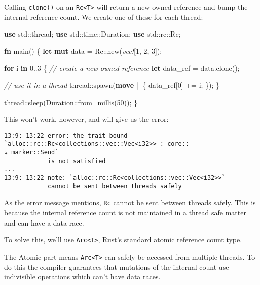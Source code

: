 \documentclass[a4paper,]{book}
\newenvironment{Shaded}{\begin{snugshade}}{\end{snugshade}}
\newcommand{\KeywordTok}[1]{\textcolor[rgb]{0.13,0.29,0.53}{\textbf{{#1}}}}
\newcommand{\DecValTok}[1]{\textcolor[rgb]{0.00,0.00,0.81}{{#1}}}
\newcommand{\CommentTok}[1]{\textcolor[rgb]{0.56,0.35,0.01}{\textit{{#1}}}}
\newcommand{\PreprocessorTok}[1]{\textcolor[rgb]{0.56,0.35,0.01}{\textit{{#1}}}}
\newcommand{\NormalTok}[1]{{#1}}
\begin{document}
Calling \texttt{clone()} on an \texttt{Rc\textless{}T\textgreater{}}
will return a new owned reference and bump the internal reference count.
We create one of these for each thread:

\begin{Shaded}
\begin{Highlighting}[]
\KeywordTok{use} \NormalTok{std::thread;}
\KeywordTok{use} \NormalTok{std::time::Duration;}
\KeywordTok{use} \NormalTok{std::rc::Rc;}

\KeywordTok{fn} \NormalTok{main() \{}
    \KeywordTok{let} \KeywordTok{mut} \NormalTok{data = Rc::new(}\PreprocessorTok{vec!}\NormalTok{[}\DecValTok{1}\NormalTok{, }\DecValTok{2}\NormalTok{, }\DecValTok{3}\NormalTok{]);}

    \KeywordTok{for} \NormalTok{i }\KeywordTok{in} \DecValTok{0.}\NormalTok{.}\DecValTok{3} \NormalTok{\{}
        \CommentTok{// create a new owned reference}
        \KeywordTok{let} \NormalTok{data_ref = data.clone();}

        \CommentTok{// use it in a thread}
        \NormalTok{thread::spawn(}\KeywordTok{move} \NormalTok{|| \{}
            \NormalTok{data_ref[}\DecValTok{0}\NormalTok{] += i;}
        \NormalTok{\});}
    \NormalTok{\}}

    \NormalTok{thread::sleep(Duration::from_millis(}\DecValTok{50}\NormalTok{));}
\NormalTok{\}}
\end{Highlighting}
\end{Shaded}

This won't work, however, and will give us the error:

\begin{verbatim}
13:9: 13:22 error: the trait bound `alloc::rc::Rc<collections::vec::Vec<i32>> : core::
↳ marker::Send`
            is not satisfied
...
13:9: 13:22 note: `alloc::rc::Rc<collections::vec::Vec<i32>>`
            cannot be sent between threads safely
\end{verbatim}

As the error message mentions, \texttt{Rc} cannot be sent between
threads safely. This is because the internal reference count is not
maintained in a thread safe matter and can have a data race.

To solve this, we'll use \texttt{Arc\textless{}T\textgreater{}}, Rust's
standard atomic reference count type.

The Atomic part means \texttt{Arc\textless{}T\textgreater{}} can safely
be accessed from multiple threads. To do this the compiler guarantees
that mutations of the internal count use indivisible operations which
can't have data races.
\end{document}
